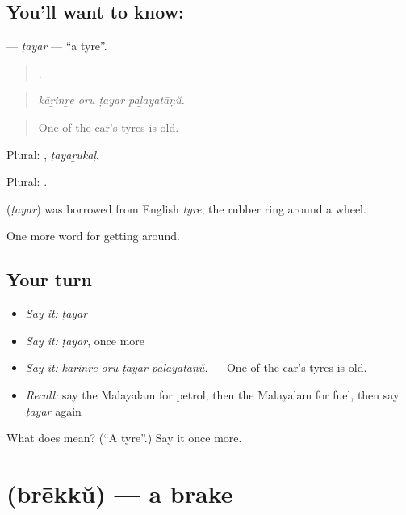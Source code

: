 \subsection*{You'll want to know: }
\textbf{} — \emph{ṭayar} — \textquotedblleft{}a tyre\textquotedblright{}.

\begin{quote}
   .
\end{quote}

\begin{quote}
\emph{kāṟinṟe oru ṭayar paḻayatāṇŭ.}
\end{quote}

\begin{quote}
One of the car's tyres is old.
\end{quote}

Plural: , \emph{ṭayaṟukaḷ}.

Plural: .

\begin{cousinweb}
\textbf{} (\emph{ṭayar}) was borrowed from English \emph{tyre}, the rubber ring around a wheel.
\end{cousinweb}

\begin{grammarlens}[title={What you've built}]
One more word for getting around.
\end{grammarlens}

\subsection*{Your turn}
\begin{itemize}
\raggedright
  \item \emph{Say it:} \emph{ṭayar}
  \item \emph{Say it:} \emph{ṭayar}, once more
  \item \emph{Say it:} \emph{kāṟinṟe oru ṭayar paḻayatāṇŭ.} — One of the car's tyres is old.
  \item \emph{Recall:} say the Malayalam for petrol, then the Malayalam for fuel, then say \emph{ṭayar} again
\end{itemize}

\begin{tcolorbox}[breakable,colback=teal!4,colframe=teal!35!black,title={Before you move on}]
What does  mean? (\textquotedblleft{}A tyre\textquotedblright{}.) Say it once more.
\end{tcolorbox}
\section[\texorpdfstring{\ml{ബ്രേക്ക്} (brēkkŭ)}{ബ്രേക്ക് (brēkkŭ)}]{ (brēkkŭ) — a brake}

